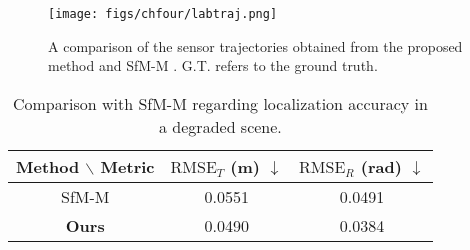 \begin{figure}[H] 
	\centering
\texttt{[image: figs/chfour/labtraj.png]}
	\caption{A comparison of the sensor trajectories obtained from the proposed method and SfM-M \cite{qingdao}. G.T. refers to the ground truth.}
	\label{labtraj}
\end{figure}

\begin{table}[th]
\caption{Comparison with SfM-M \cite{qingdao} regarding localization accuracy in a degraded scene. }
	\centering
		\begin{tabular}{c|c|c}
			\hline\hline
				Method $\backslash$ Metric & $\mathrm{RMSE}_{T}$ (m) $\downarrow$ & $\mathrm{RMSE}_{R}$ (rad) $\downarrow$\\ \hline
   SfM-M \cite{qingdao} & 0.0551 & 0.0491  \\ \hline
   \textbf{Ours} & 0.0490 & 0.0384
\\ \hline  \hline
			
		\end{tabular}
		\label{427}
  
\end{table}

